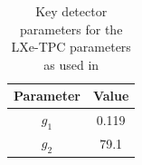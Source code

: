 \begin{table}[]
    \centering
    \begin{tabular}{c|c}
        Parameter   & Value  \\ \hline
        $g_{1}$     & 0.119 \\
        $g_{2}$     & 79.1  
    \end{tabular}
    \caption{Key detector parameters for the LXe-TPC parameters as used in \cite{LZ_projected_sensitivity_paper_ref}}
    \label{tab:projected_sensitivity_detector_parameters}
\end{table}